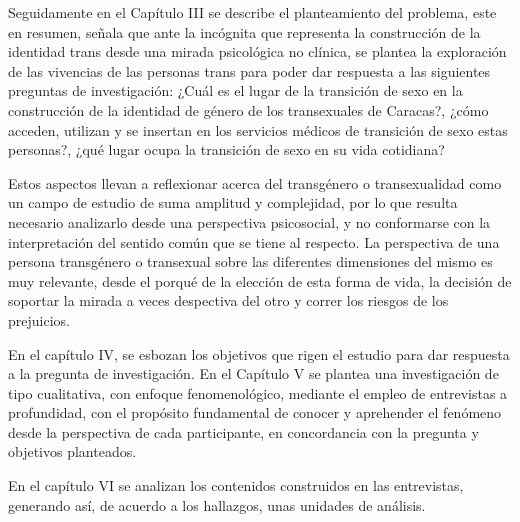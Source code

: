 Seguidamente en el Capítulo III  se describe el planteamiento del problema, este
en resumen, señala que ante la incógnita que representa la construcción de la
identidad trans desde una mirada psicológica no clínica, se plantea la
exploración de las vivencias de las personas trans para poder dar respuesta a las
siguientes preguntas de investigación: ¿Cuál es el lugar de la transición de
sexo en la construcción de la identidad de género de los transexuales de
Caracas?, ¿cómo acceden, utilizan y se insertan en los servicios médicos de
transición de sexo estas personas?, ¿qué lugar ocupa la transición de sexo en su
vida cotidiana?

Estos aspectos llevan a reflexionar acerca del transgénero o transexualidad como
un campo de estudio de suma amplitud y complejidad, por lo que resulta necesario
analizarlo desde una perspectiva psicosocial, y no conformarse con la
interpretación del sentido común que se tiene al respecto. La perspectiva de una
persona transgénero o transexual sobre las diferentes dimensiones del mismo es
muy relevante, desde el porqué de la elección de esta forma de vida, la decisión
de soportar la mirada a veces despectiva del otro y correr los riesgos de los
prejuicios.

En el capítulo IV, se esbozan los objetivos que rigen el estudio para dar
respuesta a la pregunta de investigación. En el Capítulo V se plantea una
investigación de tipo cualitativa, con enfoque fenomenológico, mediante el
empleo de entrevistas a profundidad, con el propósito fundamental de conocer y
aprehender el fenómeno desde la perspectiva de cada participante, en
concordancia con la pregunta y objetivos planteados.

En el capítulo VI se analizan los contenidos construidos en las entrevistas,
generando así, de acuerdo a los hallazgos, unas unidades de análisis.